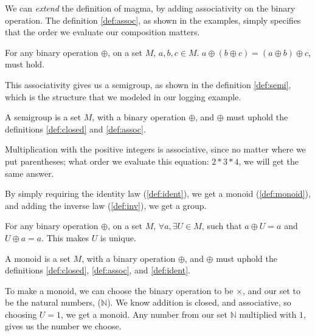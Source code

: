 We can \textit{extend} the definition of magma, by adding associativity on the
binary operation. The definition \ref{def:assoc}, as shown in the examples,
simply specifies that the order we evaluate our composition matters.

\begin{definition} \label{def:assoc}
  For any binary operation $\oplus$, on a set $M$, $a, b, c \in M$.
  $a \oplus \left ( b \oplus c \right ) = \left ( a \oplus b \right ) \oplus c$,
  must hold.
\end{definition}

This associativity gives us a semigroup, as shown in the definition
\ref{def:semi}, which is the structure that we modeled in our logging example.

\begin{definition}[Semigroup] \label{def:semi}
  A semigroup is a set $M$, with a binary operation $\oplus$, and $\oplus$ must
  uphold the definitions \ref{def:closed} and \ref{def:assoc}.
\end{definition}

\begin{exmp}
  Multiplication with the positive integers is associative, since no matter
  where we put parentheses; what order we evaluate this equation: $2 * 3 * 4$,
  we will get the same answer.
\end{exmp}

By simply requiring the identity law (\ref{def:ident}), we get a
monoid (\ref{def:monoid}), and adding the inverse law
(\ref{def:inv}), we get a group.

\begin{definition} \label{def:ident}
  For any binary operation $\oplus$, on a set $M$, $\forall a, \exists U \in M$,
  such that $a \oplus U = a$ and $U \oplus a = a$. This makes $U$ is unique.
\end{definition}

\begin{definition}[Monoid] \label{def:monoid}
  A monoid is a set $M$, with a binary operation $\oplus$, and $\oplus$ must
  uphold the definitions \ref{def:closed}, \ref{def:assoc}, and \ref{def:ident}.
\end{definition}

\begin{exmp}
  To make a monoid, we can choose the binary operation to be $\times$, and our
  set to be the natural numbers, ($\mathbb{N}$). We know addition is closed, and
  associative, so choosing $U = 1$, we get a monoid. Any number from our set
  $\mathbb{N}$ multiplied with $1$, gives us the number we choose.
\end{exmp}

